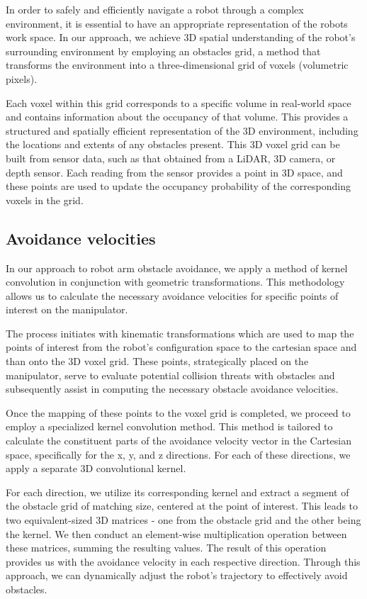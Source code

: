 \documentclass[a4paper]{article}
\begin{document}
In order to safely and efficiently navigate a robot through a complex environment, it is essential to have an appropriate representation of the robots work space. In our approach, we achieve 3D spatial understanding of the robot's surrounding environment by employing an obstacles grid, a method that transforms the environment into a three-dimensional grid of voxels (volumetric pixels).

Each voxel within this grid corresponds to a specific volume in real-world space and contains information about the occupancy of that volume. This provides a structured and spatially efficient representation of the 3D environment, including the locations and extents of any obstacles present. This 3D voxel grid can be built from sensor data, such as that obtained from a LiDAR, 3D camera, or depth sensor. Each reading from the sensor provides a point in 3D space, and these points are used to update the occupancy probability of the corresponding voxels in the grid.


\subsection{Avoidance velocities}

In our approach to robot arm obstacle avoidance, we apply a method of kernel convolution in conjunction with geometric transformations. This methodology allows us to calculate the necessary avoidance velocities for specific points of interest on the manipulator.

The process initiates with kinematic transformations which are used to map the points of interest from the robot's configuration space to the cartesian space and than onto the 3D voxel grid. These points, strategically placed on the manipulator, serve to evaluate potential collision threats with obstacles and subsequently assist in computing the necessary obstacle avoidance velocities.

Once the mapping of these points to the voxel grid is completed, we proceed to employ a specialized kernel convolution method. This method is tailored to calculate the constituent parts of the avoidance velocity vector in the Cartesian space, specifically for the x, y, and z directions. For each of these directions, we apply a separate 3D convolutional kernel.

For each direction, we utilize its corresponding kernel and extract a segment of the obstacle grid of matching size, centered at the point of interest. This leads to two equivalent-sized 3D matrices - one from the obstacle grid and the other being the kernel. We then conduct an element-wise multiplication operation between these matrices, summing the resulting values. The result of this operation provides us with the avoidance velocity in each respective direction. Through this approach, we can dynamically adjust the robot's trajectory to effectively avoid obstacles.
\end{document}
